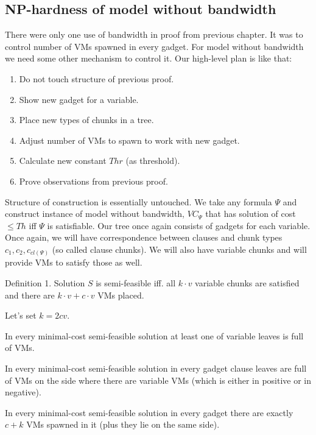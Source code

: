 \subsection{NP-hardness of model without bandwidth}

There were only one use of bandwidth in proof from previous
chapter. It was to control number of VMs spawned in every gadget. For
model without bandwidth we need some other mechanism to control
it. Our high-level plan is like that:
\begin{enumerate}
\item Do not touch structure of previous proof.
\item Show new gadget for a variable.
\item Place new types of chunks in a tree.
\item Adjust number of VMs to spawn to work with new gadget.
\item Calculate new constant $Thr$ (as threshold).
\item Prove observations from previous proof. 
\end{enumerate}

Structure of construction is essentially untouched. We take any
formula $\Psi$ and construct instance of model without bandwidth,
$VC_{\Psi}$ that has solution of cost $\leq Th$ iff $\Psi$ is
satisfiable. Our tree once again consists of gadgets for each
variable. Once again, we will have correspondence between clauses and
chunk types $c_1, c_2, c_{cl(\Psi)}$ (so called clause chunks). We
will also have variable chunks and will provide VMs to satisfy those
as well. 

Definition 1. Solution $S$ is semi-feasible iff. all $k \cdot v$ variable chunks
are satisfied and there are $k \cdot v + c \cdot v$ VMs placed.

Let's set $k = 2cv$.

\begin{lemma}
In every minimal-cost semi-feasible solution at least one of variable
leaves is full of VMs.
\end{lemma}

\begin{lemma}
In every minimal-cost semi-feasible solution in every gadget clause
leaves are full of VMs on the side where there are variable VMs (which
is either in positive or in negative).
\end{lemma}

\begin{lemma}
In every minimal-cost semi-feasible solution in every gadget there are
exactly $c + k$ VMs spawned in it (plus they lie on the same side).
\end{lemma}



